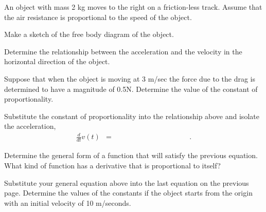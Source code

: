 \begin{problem}
\item An object with mass 2 kg moves to the right on a friction-less
  track. Assume that the air resistance is proportional to the speed
  of the object.

  \begin{subproblem}
  \item Make a sketch of the free body diagram of the object.
    \vfill

  \item Determine the relationship between the acceleration and the
    velocity in the horizontal direction of the object.

    \vfill

  \item Suppose that when the object is moving at 3 m/sec the force
    due to the drag is determined to have a magnitude of
    0.5N. Determine the value of the constant of proportionality.
    \vfill
  \item Substitute the constant of proportionality into the
    relationship above and isolate the acceleration,
    \begin{eqnarray*}
      \frac{d}{dt} v(t) & = & \hspace{10em}.
    \end{eqnarray*}
  \end{subproblem}

\clearpage

\item Determine the general form of a function that will satisfy the previous equation.
  What kind of function has a derivative that is proportional to itself?

  \vfill

\item Substitute your general equation above into the last equation on
  the previous page. Determine the values of the constants if the
  object starts from the origin with an initial velocity of 10
  m/seconds.

  \vfill

\clearpage



\end{problem}

